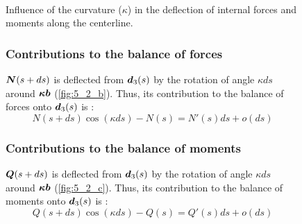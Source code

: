 \begin{figure}[p]
  \begin{leftfullpage}
    \captionsetup[subfloat]{captionskip=10pt}
     	\centering
     	 \\
	\vspace{30pt}
	\vspace{30pt}
	\caption{Influence of the curvature ($\kappa$) in the deflection of internal forces and moments along the centerline.}     
	\label{fig:5_2}
 \end{leftfullpage}
\end{figure}
\begin{figure}[p]
	\begin{fullpage}
	\subsubsection{Contributions to the balance of forces}
	\vspace{10pt}
	$\boldsymbol{N}(s+ds)$ is deflected from $\boldsymbol{d}_3(s)$ by the rotation of angle $\kappa ds$ around $\boldsymbol{\kappa b}$ (\cref{fig:5_2_b}). Thus, its contribution to the balance of forces onto $\boldsymbol{d}_3(s)$ is : 
	\begin{equation*}
		N(s+ds) \cos(\kappa ds) - N(s) = N'(s) ds + o(ds)
	\end{equation*}	
	\vspace{10pt}
	
	\subsubsection{Contributions to the balance of moments}
	\vspace{10pt}
	$\boldsymbol{Q}(s+ds)$ is deflected from $\boldsymbol{d}_3(s)$ by the rotation of angle $\kappa ds$ around $\boldsymbol{\kappa b}$ (\cref{fig:5_2_c}). Thus, its contribution to the balance of moments onto $\boldsymbol{d}_3(s)$ is : 
	\begin{equation*}
		Q(s+ds) \cos(\kappa ds) - Q(s) = Q'(s) ds + o(ds)
	\end{equation*}	
	  \end{fullpage}
\end{figure}

 
